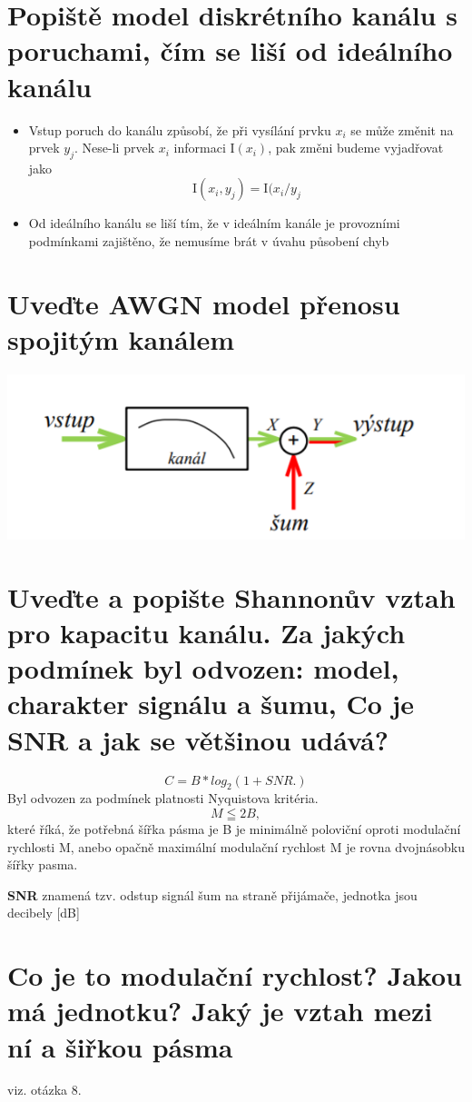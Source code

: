 \section{Popiště model diskrétního kanálu s poruchami, čím se liší od ideálního kanálu}
\begin{itemize}
    \item Vstup poruch do kanálu způsobí, že při vysílání prvku $x_i$ se může změnit na prvek $y_j$.
    Nese-li prvek $x_i$ informaci I$(x_i)$, pak změni budeme vyjadřovat jako
    $$\mathrm{I}(x_i, y_j) = \mathrm{I}(x_i / y_j$$
    \item Od ideálního kanálu se liší tím, že v ideálním kanále je provozními podmínkami zajištěno, že nemusíme brát v úvahu působení chyb
\end{itemize}

\section{Uveďte AWGN model přenosu spojitým kanálem}
\includegraphics[]{images/AWGN.png}

\section{Uveďte a popište Shannonův vztah pro kapacitu kanálu. Za jakých podmínek byl odvozen: model, charakter signálu a šumu, Co je SNR a jak se většinou udává?}
$$C = B*log_2(1+SNR.)$$
Byl odvozen za podmínek platnosti Nyquistova kritéria.
$$M \leqq 2B,$$ které říká, že potřebná šířka pásma je B je minimálně poloviční oproti modulační rychlosti M, anebo opačně maximální modulační rychlost M je rovna dvojnásobku šířky pasma.

\textbf{SNR} znamená tzv. odstup signál šum na straně přijámače, jednotka jsou decibely [dB]

\section{Co je to modulační rychlost? Jakou má jednotku? Jaký je vztah mezi ní a šiřkou pásma}
viz. otázka 8.

